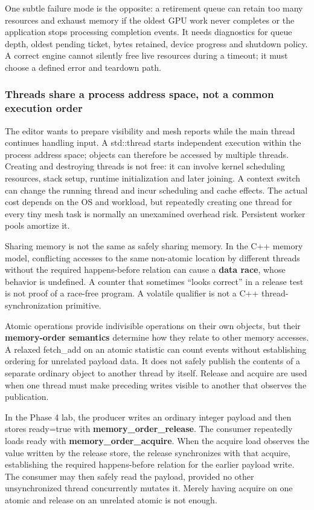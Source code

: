 One subtle failure mode is the opposite: a retirement queue can retain too many resources and exhaust memory if the oldest GPU work never completes or the application stops processing completion events. It needs diagnostics for queue depth, oldest pending ticket, bytes retained, device progress and shutdown policy. A correct engine cannot silently free live resources during a timeout; it must choose a defined error and teardown path.

\subsubsection{Threads share a process address space, not a common execution order}\label{threads-share-a-process-address-space-not-a-common-execution-order}

The editor wants to prepare visibility and mesh reports while the main thread continues handling input. A std::thread starts independent execution within the process address space; objects can therefore be accessed by multiple threads. Creating and destroying threads is not free: it can involve kernel scheduling resources, stack setup, runtime initialization and later joining. A context switch can change the running thread and incur scheduling and cache effects. The actual cost depends on the OS and workload, but repeatedly creating one thread for every tiny mesh task is normally an unexamined overhead risk. Persistent worker pools amortize it.

Sharing memory is not the same as safely sharing memory. In the C++ memory model, conflicting accesses to the same non-atomic location by different threads without the required happens-before relation can cause a \textbf{data race}, whose behavior is undefined. A counter that sometimes ``looks correct'' in a release test is not proof of a race-free program. A volatile qualifier is not a C++ thread-synchronization primitive.

Atomic operations provide indivisible operations on their own objects, but their \textbf{memory-order semantics} determine how they relate to other memory accesses. A relaxed fetch\_add on an atomic statistic can count events without establishing ordering for unrelated payload data. It does not safely publish the contents of a separate ordinary object to another thread by itself. Release and acquire are used when one thread must make preceding writes visible to another that observes the publication.

In the Phase 4 lab, the producer writes an ordinary integer payload and then stores ready=true with \textbf{memory\_order\_release}. The consumer repeatedly loads ready with \textbf{memory\_order\_acquire}. When the acquire load observes the value written by the release store, the release synchronizes with that acquire, establishing the required happens-before relation for the earlier payload write. The consumer may then safely read the payload, provided no other unsynchronized thread concurrently mutates it. Merely having acquire on one atomic and release on an unrelated atomic is not enough.

